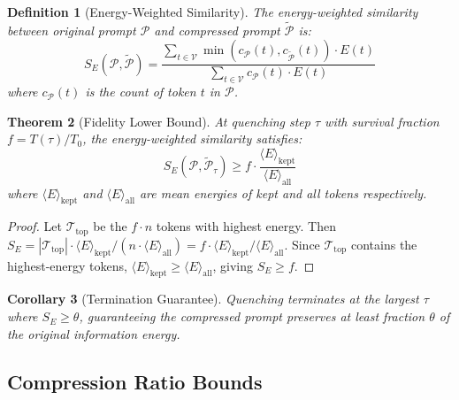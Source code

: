 \documentclass[11pt]{article}
\newtheorem{theorem}{Theorem}[section]
\newtheorem{corollary}[theorem]{Corollary}
\newtheorem{definition}[theorem]{Definition}
\theoremstyle{remark}
\begin{document}
\begin{definition}[Energy-Weighted Similarity]
\label{def:energy-sim}
The energy-weighted similarity between original prompt $\mathcal{P}$ and
compressed prompt $\tilde{\mathcal{P}}$ is:
\begin{equation}
    S_E(\mathcal{P}, \tilde{\mathcal{P}}) = \frac{
        \sum_{t \in \mathcal{V}} \min(c_{\mathcal{P}}(t), c_{\tilde{\mathcal{P}}}(t)) \cdot E(t)
    }{
        \sum_{t \in \mathcal{V}} c_{\mathcal{P}}(t) \cdot E(t)
    }
    \label{eq:energy-similarity}
\end{equation}
where $c_{\mathcal{P}}(t)$ is the count of token $t$ in $\mathcal{P}$.
\end{definition}

\begin{theorem}[Fidelity Lower Bound]
\label{thm:fidelity-bound}
At quenching step $\tau$ with survival fraction $f = T(\tau)/T_0$,
the energy-weighted similarity satisfies:
\begin{equation}
    S_E(\mathcal{P}, \tilde{\mathcal{P}}_\tau) \geq f \cdot
    \frac{\langle E \rangle_{\text{kept}}}{\langle E \rangle_{\text{all}}}
\end{equation}
where $\langle E \rangle_{\text{kept}}$ and $\langle E \rangle_{\text{all}}$
are mean energies of kept and all tokens respectively.
\end{theorem}

\begin{proof}
Let $\mathcal{T}_{\text{top}}$ be the $f \cdot n$ tokens with highest energy.
Then $S_E = |\mathcal{T}_{\text{top}}| \cdot \langle E \rangle_{\text{kept}}
/ (n \cdot \langle E \rangle_{\text{all}}) = f \cdot \langle E \rangle_{\text{kept}}
/ \langle E \rangle_{\text{all}}$. Since $\mathcal{T}_{\text{top}}$ contains
the highest-energy tokens, $\langle E \rangle_{\text{kept}} \geq
\langle E \rangle_{\text{all}}$, giving $S_E \geq f$.
\end{proof}

\begin{corollary}[Termination Guarantee]
\label{cor:termination}
Quenching terminates at the largest $\tau$ where $S_E \geq \theta$,
guaranteeing the compressed prompt preserves at least fraction $\theta$
of the original information energy.
\end{corollary}

\subsection{Compression Ratio Bounds}
\label{sec:bounds}
\end{document}

